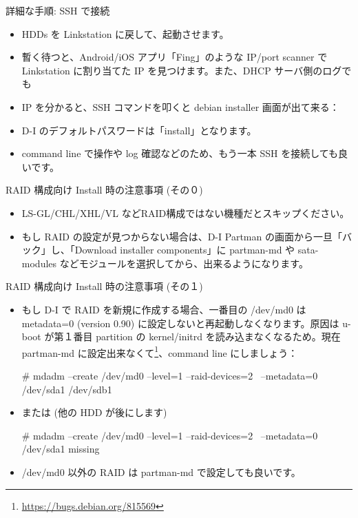 \begin{frame}[containsverbatim]{詳細な手順: SSH で接続}
\begin{itemize}
\item HDDs を Linkstation に戻して、起動させます。
\item 暫く待つと、Android/iOS アプリ「Fing」のような IP/port scanner で Linkstation に割り当てた IP を見つけます。また、DHCP サーバ側のログでも
\item IP を分かると、SSH コマンドを叩くと debian installer 画面が出て来る：
\end{itemize}
\begin{itemize}
\item D-I のデフォルトパスワードは「install」となります。
\item command line で操作や log 確認などのため、もう一本 SSH を接続しても良いです。
\end{itemize}
\end{frame}

\begin{frame}[containsverbatim]{RAID 構成向け Install 時の注意事項 (その０)}
\begin{itemize}
\item LS-GL/CHL/XHL/VL などRAID構成ではない機種だとスキップください。
\item もし RAID の設定が見つからない場合は、D-I Partman の画面から一旦「バック」し、「Download installer components」に partman-md や sata-modules などモジュールを選択してから、出来るようになります。
\end{itemize}
\end{frame}

\begin{frame}[containsverbatim]{RAID 構成向け Install 時の注意事項 (その１)}
\begin{itemize}
\item もし D-I で RAID を新規に作成する場合、一番目の /dev/md0 は metadata=0 (version 0.90) に設定しないと再起動しなくなります。原因は u-boot が第１番目 partition の kernel/initrd を読み込まなくなるため。現在 partman-md に設定出来なくて\footnote{\url{https://bugs.debian.org/815569}}、command line にしましょう：
\begin{commandline}
# mdadm --create /dev/md0 --level=1 --raid-devices=2 \
  --metadata=0 /dev/sda1 /dev/sdb1
\end{commandline}
\item または (他の HDD が後にします)
\begin{commandline}
# mdadm --create /dev/md0 --level=1 --raid-devices=2 \
  --metadata=0 /dev/sda1 missing
\end{commandline}
\item /dev/md0 以外の RAID は partman-md で設定しても良いです。
\end{itemize}
\end{frame}

